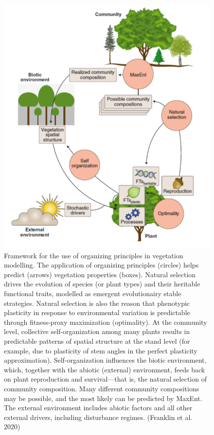 \documentclass[
  12pt,
  oneside]{book}
\begin{document}
\begin{figure}

{\centering \includegraphics[width=0.8\linewidth]{figures/chap7/f719_franklin} 

}

\caption{Framework for the use of organizing principles in vegetation modelling. The application of organizing principles (circles) helps predict (arrows) vegetation properties (boxes). Natural selection drives the evolution of species (or plant types) and their heritable functional traits, modelled as emergent evolutionairy stable strategies. Natural selection is also the reason that phenotypic plasticity in response to environmental variation is predictable through fitness-proxy maximization (optimality). At the community level, collective self-organization among many plants results in predictable patterns of spatial structure at the stand level (for example, due to plasticity of stem angles in the perfect plasticity approximation). Self-organization influences the biotic environment, which, together with the abiotic (external) environment, feeds back on plant reproduction and survival—that is, the natural selection of community composition. Many different community compositions may be possible, and the most likely can be predicted by MaxEnt. The external environment includes abiotic factors and all other external drivers, including disturbance regimes. (Franklin et al. 2020)}\label{fig:f719}
\end{figure}
\end{document}

